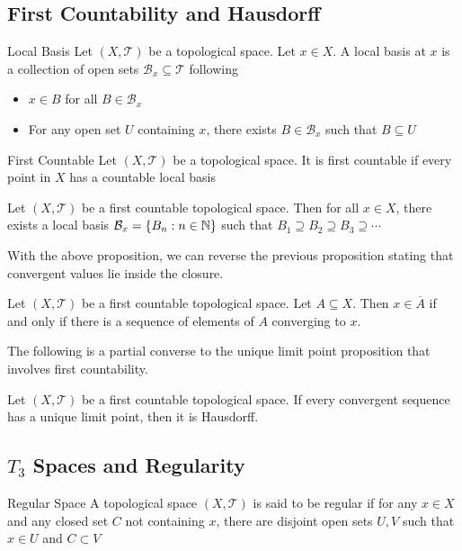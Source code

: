 \documentclass[a4paper]{article}
\begin{document}
\subsection{First Countability and Hausdorff}
\begin{defn}{Local Basis}{} Let $(X,\mathcal{T})$ be a topological space. Let $x\in X$. A local basis at $x$ is a collection of open sets $\mathcal{B}_x\subseteq\mathcal{T}$ following
\begin{itemize}
\item $x\in B$ for all $B\in\mathcal{B}_x$
\item For any open set $U$ containing $x$, there exists $B\in\mathcal{B}_x$ such that $B\subseteq U$
\end{itemize}
\end{defn}

\begin{defn}{First Countable}{} Let $(X,\mathcal{T})$ be a topological space. It is first countable if every point in $X$ has a countable local basis
\end{defn}

\begin{prp}{}{} Let $(X,\mathcal{T})$ be a first countable topological space. Then for all $x\in X$, there exists a local basis $\mathcal{B}_x=\{B_n:n\in\mathbb{N}\}$ such that $B_1\supseteq B_2\supseteq B_3\supseteq\cdots$
\end{prp}

With the above proposition, we can reverse the previous proposition stating that convergent values lie inside the closure. 

\begin{prp}{}{} Let $(X,\mathcal{T})$ be a first countable topological space. Let $A\subseteq X$. Then $x\in\overline{A}$ if and only if there is a sequence of elements of $A$ converging to $x$. 
\end{prp}

The following is a partial converse to the unique limit point proposition that involves first countability. 


\begin{prp}{}{} Let $(X,\mathcal{T})$ be a first countable topological space. If every convergent sequence has a unique limit point, then it is Hausdorff. 
\end{prp}

\subsection{$T_3$ Spaces and Regularity}
\begin{defn}{Regular Space}{} A topological space $(X,\mathcal{T})$ is said to be regular if for any $x\in X$ and any closed set $C$ not containing $x$, there are disjoint open sets $U,V$ such that $x\in U$ and $C\subset V$
\end{defn}
\end{document}

